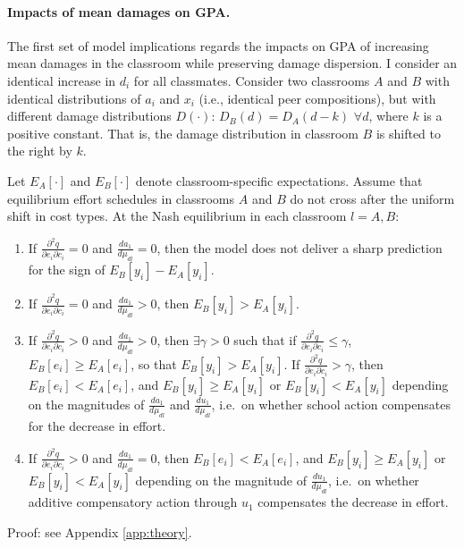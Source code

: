 \paragraph{Impacts of mean damages on GPA.} The first set of model implications regards the impacts on GPA of increasing mean damages in the classroom while preserving damage dispersion. I consider an identical increase in $d_i$ for all classmates. Consider two classrooms $A$ and $B$ with identical distributions of $a_i$ and $x_i$ (i.e., identical peer compositions), but with different damage distributions $D(\cdot)$: $D_{B}(d)=D_{A}(d-k)$ $\forall d$, where $k$ is a positive constant. That is, the damage distribution in classroom $B$ is shifted to the right by $k$. \par 


\begin{proposition}\label{prop2}
Let $E_A[\cdot]$ and $E_B[\cdot]$ denote classroom-specific expectations. 
Assume that equilibrium effort schedules in classrooms $A$ and $B$ do not cross after the uniform shift in cost types. 
At the Nash equilibrium in each classroom $l=A,B$:

\begin{enumerate}[label=(\roman*),itemsep=0pt,parsep=0pt,topsep=0pt]

\item 
If $\frac{\partial^2 q}{\partial e_i \partial c_i}=0$ and $\frac{d a_1}{d\mu_{dl}}=0$, 
then the model does not deliver a sharp prediction for the sign of $E_B[y_i]-E_A[y_i]$.


\item 
If $\frac{\partial^2 q}{\partial e_i \partial c_i}=0$ and $\frac{d a_1}{d\mu_{dl}}>0$, 
then $E_B[y_i]>E_A[y_i]$.  


\item 
If $\frac{\partial^2 q}{\partial e_i \partial c_i}>0$ and $\frac{d a_1}{d\mu_{dl}}>0$, 
then $\exists \gamma>0$ such that if $\frac{\partial^2 q}{\partial e_i \partial c_i}\le \gamma$, $E_B[e_i]\ge E_A[e_i]$, so that $E_B[y_i]>E_A[y_i]$. If $\frac{\partial^2 q}{\partial e_i \partial c_i}>\gamma$, then $E_B[e_i]<E_A[e_i]$, and  
$E_B[y_i] \ge E_A[y_i]$ or $E_B[y_i]<E_A[y_i]$ depending on the magnitudes of 
$\frac{d a_1}{d\mu_{dl}}$ and $\frac{d u_1}{d\mu_{dl}}$, i.e.\ on whether school action compensates for the decrease in effort.


\item 
If $\frac{\partial^2 q}{\partial e_i \partial c_i}>0$ and $\frac{d a_1}{d\mu_{dl}}=0$, 
then $E_B[e_i]<E_A[e_i]$, and  
$E_B[y_i] \ge E_A[y_i]$ or $E_B[y_i]<E_A[y_i]$ depending on the magnitude of $\frac{d u_1}{d\mu_{dl}}$, 
i.e.\ on whether additive compensatory action through $u_1$ compensates the decrease in effort.

\end{enumerate}
\end{proposition}
 Proof: see Appendix \ref{app:theory}.\par 

